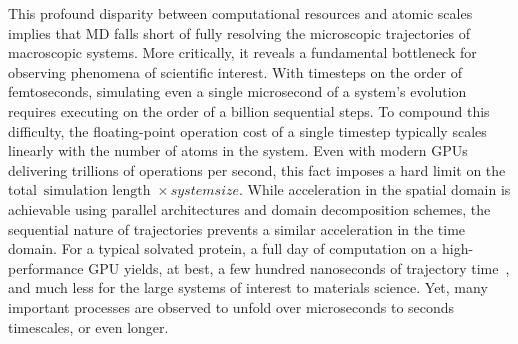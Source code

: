 \noindent   
This profound disparity between computational resources and atomic scales implies that MD falls short of fully resolving the microscopic trajectories of macroscopic systems. More critically, it reveals a fundamental bottleneck for observing phenomena of scientific interest. With timesteps on the order of femtoseconds, simulating even a single microsecond of a system's evolution requires executing on the order of a billion sequential steps. To compound this difficulty, the floating-point operation cost of a single timestep typically scales linearly with the number of atoms in the system.
Even with modern GPUs delivering trillions of operations per second, this fact imposes a hard limit on the total~$\text{simulation length }\times{ system size}$. While acceleration in the spatial domain is achievable using parallel architectures and domain decomposition schemes, the sequential nature of trajectories prevents a similar acceleration in the time domain. For a typical solvated protein, a full day of computation on a high-performance GPU yields, at best, a few hundred nanoseconds of trajectory time~\cite{HD18}, and much less for the large systems of interest to materials science. Yet, many important processes are observed to unfold over microseconds to seconds timescales, or even longer.

